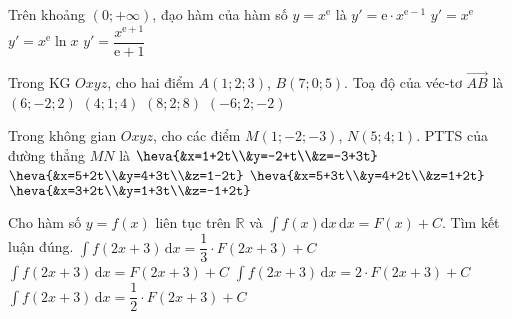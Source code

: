 \begin{ex}%
	Trên khoảng $(0 ;+\infty)$, đạo hàm của hàm số $y=x^{\mathrm{e}}$ là	
	\choice
	{\True $y'=\mathrm{e}\cdot x^{\mathrm{e}-1}$}
	{$y'=x^{\mathrm{e}}$}
	{$y'=x^{\mathrm{e}}\ln x$}
	{$y'=\dfrac{x^{\mathrm{e}+1}}{\mathrm{e}+1}$}
\end{ex}
\begin{ex}%
	Trong KG $Oxyz$, cho hai điểm $A(1 ; 2 ; 3)$, $B(7 ; 0 ; 5)$. Toạ độ của véc-tơ $\overrightarrow{A B}$ là	
	\choice
	{\True $(6;-2;2)$}
	{$(4;1;4)$}
	{$(8;2;8)$}
	{$(-6;2;-2)$}
\end{ex}
\begin{ex}%
	Trong không gian $O x y z$, cho các điểm $M(1 ;-2 ;-3)$, $N(5 ; 4 ; 1)$. PTTS của đường thẳng $M N$ là	
	\choice
	{$\heva{&x=1+2t\\&y=-2+t\\&z=-3+3t}$}
	{$\heva{&x=5+2t\\&y=4+3t\\&z=1-2t}$}
	{ $\heva{&x=5+3t\\&y=4+2t\\&z=1+2t}$}
	{\True$\heva{&x=3+2t\\&y=1+3t\\&z=-1+2t}$}
\end{ex}
\begin{ex}%
	Cho hàm số $y=f(x)$ liên tục trên $\mathbb{R}$ và $\displaystyle\int\limits f(x) \mathrm{d} x\mathrm{\,d} x=F(x)+C$. Tìm kết luận đúng.	
	\choice
	{$\displaystyle\int\limits f(2 x+3) \mathrm{\,d} x=\dfrac{1}{3} \cdot F(2 x+3)+C$}
	{$\displaystyle\int\limits f(2 x+3) \mathrm{\,d} x=F(2 x+3)+C$}
	{$\displaystyle\int\limits f(2 x+3) \mathrm{\,d} x=2 \cdot F(2 x+3)+C$}
	{\True $\displaystyle\int\limits f(2 x+3) \mathrm{\,d} x=\dfrac{1}{2} \cdot F(2 x+3)+C$}
\end{ex}
